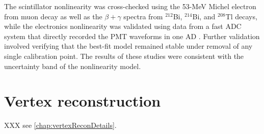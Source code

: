\documentclass[../thesis.tex]{subfiles}
\begin{document}
The scintillator nonlinearity was cross-checked using the 53-MeV Michel electron from muon decay as well as the $\beta+\gamma$ spectra from $^{212}$Bi, $^{214}$Bi, and $^{208}$Tl decays, while the electronics nonlinearity was validated using data from a fast ADC system that directly recorded the PMT waveforms in one AD \cite{HUANG201848}. Further validation involved verifying that the best-fit model remained stable under removal of any single calibration point. The results of these studies were consistent with the uncertainty band of the nonlinearity model.

\section{Vertex reconstruction}
\label{sec:reconVertexOverview}

XXX see \autoref{chap:vertexReconDetails}.
\end{document}
